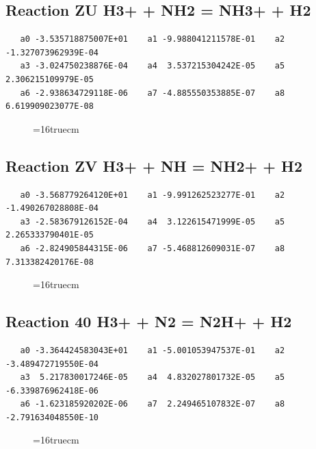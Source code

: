 \documentclass[12pt,dvipdfm]{article}
\begin{document}
\subsection{
Reaction ZU H3+ + NH2 = NH3+ + H2}
\begin{small}\begin{verbatim}
   a0 -3.535718875007E+01    a1 -9.988041211578E-01    a2 -1.327073962939E-04
   a3 -3.024750238876E-04    a4  3.537215304242E-05    a5  2.306215109979E-05
   a6 -2.938634729118E-06    a7 -4.885550353885E-07    a8  6.619909023077E-08
   \end{verbatim}\end{small}
\begin{figure}[h!]
\label{n2rates}
\epsfxsize=16truecm
\end{figure}
\newpage

\subsection{
Reaction ZV H3+ + NH = NH2+ + H2}
\begin{small}\begin{verbatim}
   a0 -3.568779264120E+01    a1 -9.991262523277E-01    a2 -1.490267028808E-04
   a3 -2.583679126152E-04    a4  3.122615471999E-05    a5  2.265333790401E-05
   a6 -2.824905844315E-06    a7 -5.468812609031E-07    a8  7.313382420176E-08
   \end{verbatim}\end{small}
\begin{figure}[h!]
\label{n2rates}
\epsfxsize=16truecm
\end{figure}
\newpage

\subsection{
Reaction 40 H3+ + N2 = N2H+ + H2}
\begin{small}\begin{verbatim}
   a0 -3.364424583043E+01    a1 -5.001053947537E-01    a2 -3.489472719550E-04
   a3  5.217830017246E-05    a4  4.832027801732E-05    a5 -6.339876962418E-06
   a6 -1.623185920202E-06    a7  2.249465107832E-07    a8 -2.791634048550E-10
   \end{verbatim}\end{small}
\begin{figure}[h!]
\label{n2rates}
\epsfxsize=16truecm
\end{figure}
\newpage
\end{document}
